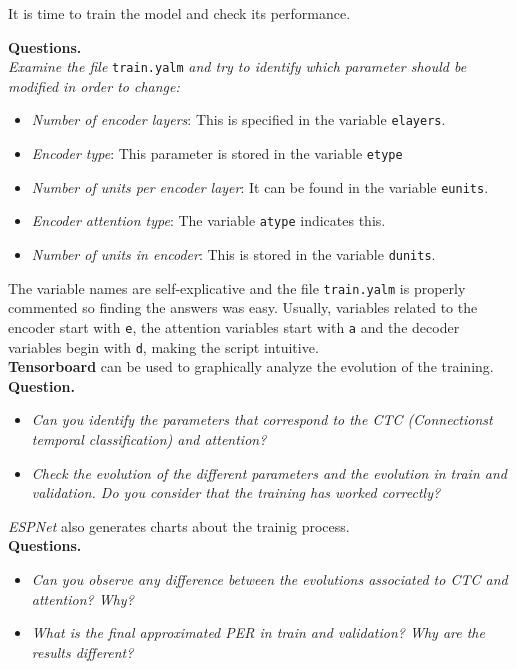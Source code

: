 \documentclass[a4paper]{article}
\def\inline{\lstinline[basicstyle=\ttfamily,keywordstyle={}]}
\begin{document}
It is time to train the model and check its performance. 

\textbf{Questions.}\\

\emph{Examine the file} \inline{train.yalm} \emph{and try to identify which parameter should be modified in order to change:}
\begin{itemize}
  \item \emph{Number of encoder layers}: This is specified in the variable \inline{elayers}. 
  \item \emph{Encoder type}: This parameter is stored in the variable \inline{etype}
  \item \emph{Number of units per encoder layer}: It can be found in the variable \inline{eunits}.
  \item \emph{Encoder attention type}: The variable \inline{atype} indicates this.
  \item \emph{Number of units in encoder}: This is stored in the variable \inline{dunits}.

\end{itemize}
The variable names are self-explicative and the file \inline{train.yalm} is properly commented so finding the answers was easy. Usually, variables related to the encoder start with \inline{e}, the attention variables start with \inline{a} and the decoder variables begin with \inline{d}, making the script intuitive.\\

\textbf{Tensorboard} can be used to graphically analyze the evolution of the training.\\

\textbf{Question.}
\begin{itemize}
\item \emph{Can you identify the parameters that correspond to the CTC (Connectionst temporal classification) and attention?}
\item \emph{Check the evolution of the different parameters and the evolution in train and validation. Do you consider that the training has worked correctly? }
\end{itemize}

\emph{ESPNet} also generates charts about the trainig process.\\

\textbf{Questions.}
\begin{itemize}
\item \emph{Can you observe any difference between the evolutions associated to CTC and attention? Why?}
\item \emph{What is the final approximated PER in train and validation? Why are the results different? }
\end{itemize}
\end{document}

